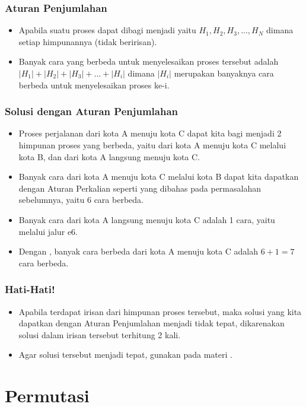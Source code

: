 \begin{frame}
\frametitle{Aturan Penjumlahan}
\begin{itemize}
  \item Apabila suatu proses dapat dibagi menjadi  yaitu $H_{1}, H_{2}, H_{3}, ... , H_{N}$ dimana setiap himpunannya  (tidak beririsan).
  \item Banyak cara yang berbeda untuk menyelesaikan proses tersebut adalah $|H_{1}| + |H_{2}| + |H_{3}| + ... + |H_{i}|$ dimana $|H_{i}|$ merupakan banyaknya cara berbeda untuk menyelesaikan proses ke-i.
\end{itemize}
\end{frame}

\begin{frame}
\frametitle{Solusi dengan Aturan Penjumlahan}
\begin{itemize}
  \item Proses perjalanan dari kota A menuju kota C dapat kita bagi menjadi 2 himpunan proses yang berbeda, yaitu dari kota A menuju kota C melalui kota B, dan dari kota A langsung menuju kota C.
  \item Banyak cara dari kota A menuju kota C melalui kota B dapat kita dapatkan dengan Aturan Perkalian seperti yang dibahas pada permasalahan sebelumnya, yaitu 6 cara berbeda.
  \item Banyak cara dari kota A langsung menuju kota C adalah 1 cara, yaitu melalui jalur e6.
  \item Dengan , banyak cara berbeda dari kota A menuju kota C adalah $6 + 1 = 7$ cara berbeda.
\end{itemize}
\end{frame}

\begin{frame}
\frametitle{Hati-Hati!}
\begin{itemize}
  \item Apabila terdapat irisan dari himpunan proses tersebut, maka solusi yang kita dapatkan dengan Aturan Penjumlahan menjadi tidak tepat, dikarenakan solusi dalam irisan tersebut terhitung 2 kali.
  \item Agar solusi tersebut menjadi tepat, gunakan  pada materi .
\end{itemize}
\end{frame}

\section{Permutasi}
\frame{\sectionpage}

